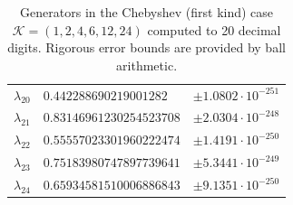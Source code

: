 \documentclass[a4paper,10pt]{article}
\begin{document}
\begin{appendix}
\begin{table}[h]
\begin{tabular}{|l|ll|}
  $\lambda_{20}$ & $0.442288690219001282$    &  $\pm 1.0802 \cdot 10^{-251}$ \\
  $\lambda_{21}$ & $0.83146961230254523708$  &  $\pm 2.0304 \cdot 10^{-248}$ \\
  $\lambda_{22}$ & $0.55557023301960222474$  &  $\pm 1.4191 \cdot 10^{-250}$ \\
  $\lambda_{23}$ & $0.75183980747897739641$  &  $\pm 5.3441 \cdot 10^{-249}$ \\
  $\lambda_{24}$ & $0.65934581510006886843$  &  $\pm 9.1351 \cdot 10^{-250}$ \\
  \hline
  \end{tabular}
  \caption{Generators in the Chebyshev (first kind) case $\mathcal{K} = (1, 2, 4, 6, 12, 24)$
  computed to 20 decimal digits. Rigorous error bounds are provided by ball
  arithmetic.}
\end{table}


\end{appendix}
\end{document}
